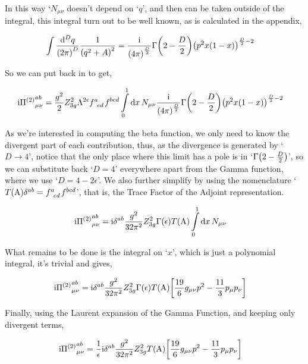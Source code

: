 In this way `$N_{\mu\nu}$ doesn't depend on `$q$', and then can be taken outside of the integral, this integral turn out to 
be well known, as is calculated in the appendix,

\begin{align}
    \int\frac{\dd[D]{q}}{\qty(2\pi)^D}\frac{1}{\qty(q^2+A)^2}&=\frac{\textnormal{i}}{\qty(4\pi)^{\frac D2}}\Gamma\qty(2-\frac D2)\qty(p^2x\qty(1-x))^{\frac D2-2}\nonumber
\end{align}

So we can put back in to get,

\begin{align}
    \im {\Pi^{\qty(2)}}^{ab}_{\mu\nu}&=\frac{g^2}{2}Z_{3g}^2\Lambda^{2\epsilon}\tensor{f}{^a_c_d}\tensor{f}{^b^c^d}\int\limits_0^1\dd{x}N_{\mu\nu}\frac{\im}{\qty(4\pi)^{\frac D2}}\Gamma\qty(2-\frac D2)\qty(p^2x\qty(1-x))^{\frac D2-2}\nonumber
\end{align}

As we're interested in computing the beta function, we only need to know the divergent part of each contribution, thus, as the 
divergence is generated by `$D\rightarrow 4$', notice that the only place where this limit has a pole is in `$\Gamma\qty(2-\frac D 2)$', 
so we can substitute back `$D=4$' everywhere apart from the Gamma function, where we use `$D=4-2\epsilon$'. We also further 
simplify by using the nomenclature `$T\qty(\textnormal{A})\delta^{ab}=\tensor{f}{^a_c_d}\tensor{f}{^b^c^d}$', that is, the Trace Factor 
of the Adjoint representation.

\begin{align}
    \textnormal{i} {\Pi^{\qty(2)}}^{ab}_{\mu\nu}&=\textnormal{i}\delta^{ab}\frac{g^2}{32\pi^2}Z_{3g}^2\Gamma\qty(\epsilon)T\qty(\textnormal{A})\int\limits_0^1\dd{x}N_{\mu\nu}\nonumber
\end{align}

What remains to be done is the integral on `$x$', which is just a polynomial integral, it's trivial and gives,

\begin{align}
    \textnormal{i} {\Pi^{\qty(2)}}^{ab}_{\mu\nu}&=\textnormal{i}\delta^{ab}\frac{g^2}{32\pi^2}Z_{3g}^2\Gamma\qty(\epsilon)T\qty(\textnormal{A})\qty[\frac{19}{6}g_{\mu\nu}p^2-\frac{11}{3}p_\mu p_\nu]\nonumber
\end{align}

Finally, using the Laurent expansion of the Gamma Function, and keeping only divergent terms,

\begin{align}
    \textnormal{i} {\Pi^{\qty(2)}}^{ab}_{\mu\nu}&=\frac1\epsilon\textnormal{i}\delta^{ab}\frac{g^2}{32\pi^2}Z_{3g}^2T\qty(\textnormal{A})\qty[\frac{19}{6}g_{\mu\nu}p^2-\frac{11}{3}p_\mu p_\nu]\nonumber
\end{align}

